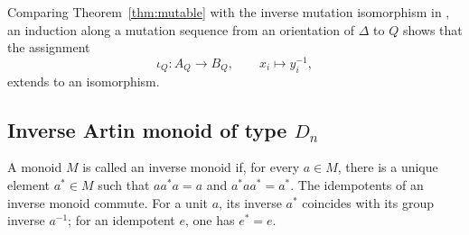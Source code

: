 \documentclass[a4paper, 12pt, reqno]{amsart}
\theoremstyle{definition}
\begin{document}
Comparing Theorem~\ref{thm:mutable} with the inverse mutation isomorphism in \cite[Remark~2.11]{GM2017}, an induction along a mutation sequence from an orientation of $\Delta$ to $Q$ shows that the assignment
\[
\iota_Q:A_Q\longrightarrow B_Q,\qquad  x_i\longmapsto y_i^{-1},
\]
extends to an isomorphism.





\subsection{Inverse Artin monoid of type $D_n$}\label{sec:nverse Artin monoid of type Dn}

A monoid $M$ is called an inverse monoid if, for every $a\in M$, there is a unique element $a^*\in M$ such that $aa^*a=a$ and $a^*aa^*=a^*.$ The idempotents of an inverse monoid commute. For a unit $a$, its inverse $a^*$ coincides with its group inverse $a^{-1}$; for an idempotent $e$, one has $e^*=e$.
\end{document}
